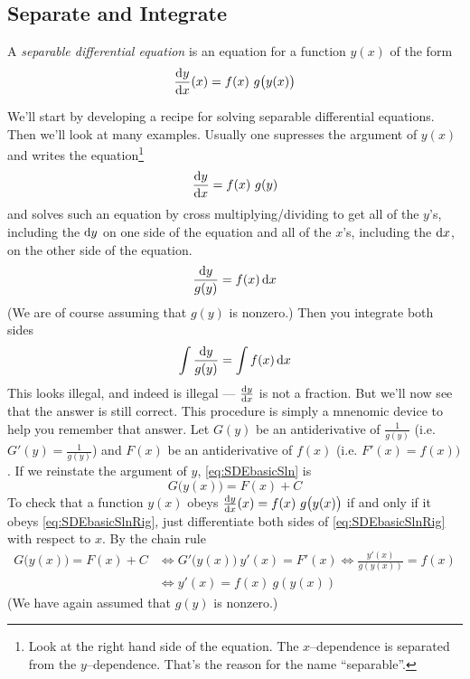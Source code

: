 \subsection{Separate and Integrate}

\begin{defn}\label{def:SDEsepdiffeq}
A \emph{separable differential equation} is an equation for a function
$y(x)$ of the form
\begin{equation*}
\diff{y}{x}(x) = f(x)\ g\big(y(x)\big)
\end{equation*}
\end{defn}

We'll start by developing a recipe for solving separable differential
equations. Then we'll look at many examples.
Usually one supresses the argument of $y(x)$  and writes the
equation\footnote{Look at the right hand side of the equation.
The $x$--dependence is separated from the $y$--dependence. That's
the reason for the name ``separable''.}
\begin{equation*}
\diff{y}{x} = f(x)\ g(y)
\end{equation*}
and solves such an equation by cross multiplying/dividing
to get all of the $y$'s, including the $\mathrm{d}y$ on one side of
the equation and all of the $x$'s, including the $\mathrm{d}x$, on the
other side of the equation.
\begin{equation*}
\frac{\mathrm{d}y}{g(y)}=f(x)\,\mathrm{d}x
\end{equation*}
(We are of course assuming that $g(y)$ is nonzero.)
Then you integrate both sides
\begin{equation}\label{eq:SDEbasicSln}
\int\frac{\mathrm{d}y}{g(y)}=\int f(x)\,\mathrm{d}x
\end{equation}
This looks illegal, and indeed is illegal --- $\diff{y}{x}$ is not a fraction.
But we'll now see that the answer is still correct. This procedure is simply
a mnenomic device to help you remember that answer. Let $G(y)$ be an
antiderivative of $\frac{1}{g(y)}$ (i.e. $G'(y)=\frac{1}{g(y)}$) and
$F(x)$ be an antiderivative of $f(x)$ (i.e. $F'(x)=f(x))$.
If we reinstate the argument of $y$, \eqref{eq:SDEbasicSln} is
\begin{equation}\label{eq:SDEbasicSlnRig}
G\big(y(x)\big) = F(x) + C
\end{equation}
To check that a function $y(x)$ obeys
$\diff{y}{x}(x) = f(x)\ g\big(y(x)\big)$ if and only if it obeys
\eqref{eq:SDEbasicSlnRig}, just differentiate both sides of
\eqref{eq:SDEbasicSlnRig} with respect to $x$. By the chain rule
\begin{align*}
G\big(y(x)\big) = F(x) + C
&\iff G'\big(y(x)\big)\ y'(x) = F'(x)
\iff \frac{y'(x)}{g(y(x))}=f(x) \\
&\iff y'(x) = f(x)\ g(y(x))
\end{align*}
(We have again assumed that $g(y)$ is nonzero.)

